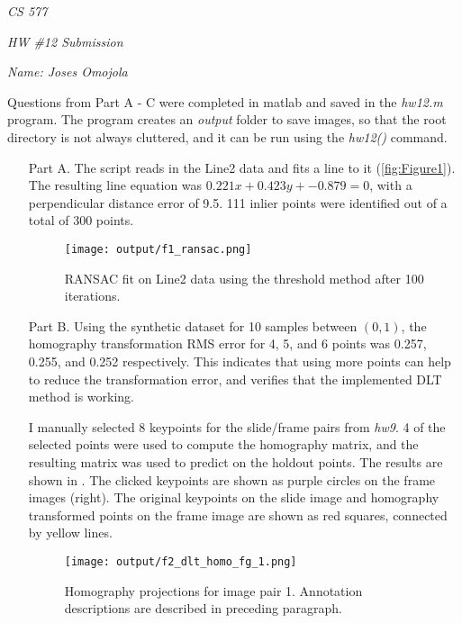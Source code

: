 \documentclass[12pt]{report}
\begin{document}
\centerline{\it CS 577}
\centerline{\it HW \#12 Submission}
\centerline{\it Name: Joses Omojola}

Questions from Part A - C were completed in matlab and saved in the \emph{hw12.m} program. The program creates an \emph{output} folder to save images, so that the 
root directory is not always cluttered, and it can be run using the \textit{hw12()} command. 

\begin{enumerate}

    \item[Part A.] The script reads in the Line2 data and fits a line to it (\autoref{fig:Figure1}). The resulting line equation was $0.221x + 0.423y + -0.879 = 0$, with 
    a perpendicular distance error of 9.5. 111 inlier points were identified out of a total of 300 points.

    \begin{figure}[H]
        \centering
        \texttt{[image: output/f1\_ransac.png]}
        \caption{RANSAC fit on Line2 data using the threshold method after 100 iterations.}
        \label{fig:Figure1}
    \end{figure}

    \item[Part B.] Using the synthetic dataset for 10 samples between $(0,1)$, the homography transformation RMS error for 4, 5, and 6 points was 0.257, 0.255, and 0.252 
    respectively. This indicates that using more points can help to reduce the transformation error, and verifies that the implemented DLT method is working.  

    I manually selected 8 keypoints for the slide/frame pairs from \emph{hw9}. 4 of the selected points were used to compute the homography matrix, and the resulting matrix 
    was used to predict on the holdout points. The results are shown in . The clicked keypoints are shown as purple circles on the 
    frame images (right). The original keypoints on the slide image and homography transformed points on the frame image are shown as red squares, connected by yellow lines.

    \begin{figure}[H]
        \centering
        \texttt{[image: output/f2\_dlt\_homo\_fg\_1.png]}
        \caption{Homography projections for image pair 1. Annotation descriptions are described in preceding paragraph.}
        \label{fig:Figure2}
    \end{figure}


\end{enumerate}
\end{document}
